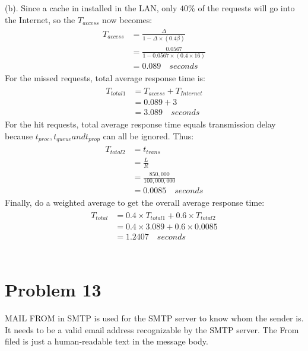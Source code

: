 \documentclass[titlepage, paper=a4, fontsize=11pt]{scrartcl} %
\numberwithin{equation}{section} %
\numberwithin{table}{section} %
\begin{document}
(b). Since a cache in installed in the LAN, only $40\%$ of the requests will go into the Internet,
so the $T_{access}$ now becomes:
\begin{align*} 
\begin{split}
T_{access} &= \frac{\Delta}{1-\Delta \times (0.4\beta)} \\
&= \frac{0.0567}{1-0.0567 \times (0.4 \times 16)} \\
&= 0.089 \quad seconds
\end{split}					
\end{align*}
For the missed requests, total average response time is:
\begin{align*} 
\begin{split}
T_{total1} &= T_{access} + T_{Internet} \\
&= 0.089 + 3 \\
&= 3.089 \quad seconds
\end{split}					
\end{align*}
For the hit requests, total average response time equals transmission delay because
$t_{proc}, t_{queue} and t_{prop}$ can all be ignored. Thus:
\begin{align*} 
\begin{split}
T_{total2} &= t_{trans} \\
&= \frac{L}{R} \\
&= \frac{850,000}{100,000,000} \\
&= 0.0085 \quad seconds
\end{split}					
\end{align*}
Finally, do a weighted average to get the overall average response time:
\begin{align*} 
\begin{split}
T_{total} &= 0.4 \times T_{total1} + 0.6 \times T_{total2} \\
&= 0.4 \times 3.089 + 0.6 \times 0.0085 \\
&= 1.2407 \quad seconds
\end{split}					
\end{align*}
\\



\section*{Problem 13}
MAIL FROM in SMTP is used for the SMTP server to know whom the sender is. It needs to be a valid
email address recognizable by the SMTP server. The From filed is just a human-readable text in the message body.
\\
\end{document}
